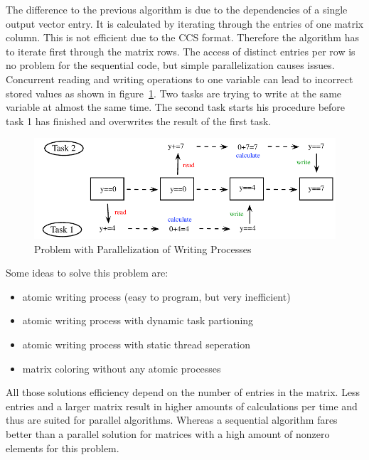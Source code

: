 \documentclass[a4paper,11pt]{scrartcl}
\begin{document}
The difference to the previous algorithm is due to the dependencies of a single
output vector entry. It is calculated by iterating through the entries
of one matrix column. This is not efficient due to the CCS format.
Therefore the algorithm has to iterate first through the matrix rows.
The access of distinct entries per row is no problem for the sequential
code, but simple parallelization causes issues.
Concurrent reading and writing operations to one variable can lead to incorrect
stored values as shown in figure~\ref{figure:parallelwriting}. Two
tasks are trying to write at the same variable at almost the same time. The
second task starts his procedure before task 1 has finished and overwrites the
result of the first task.

\begin{figure}[ht]
\label{figure:parallelwriting}
\includegraphics{graphic/parallel_writing_problem.pdf}
\caption{Problem with Parallelization of Writing Processes}
\end{figure}

\begin{samepage}
Some ideas to solve this problem are:
\begin{itemize}
\item atomic writing process (easy to program, but very inefficient)
\item atomic writing process with dynamic task partioning
\item atomic writing process with static thread seperation
\item matrix coloring without any atomic processes
\end{itemize}
\end{samepage}

All those solutions efficiency depend on the number of entries in the matrix.
Less entries and a larger matrix result in higher amounts of calculations per
time and thus are suited for parallel algorithms.
Whereas a sequential algorithm fares better than a parallel solution for
matrices with a high amount of nonzero elements for this problem.
\end{document}
